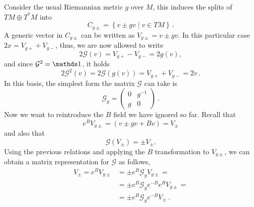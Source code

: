 \documentclass[debug]{phd}
\begin{document}
						Consider the usual Riemannian metric $g$ over $M$, this induces the splits of $TM \oplus T^*M$ into
								\begin{equation}
									C_{g\pm} = \left\{v \pm gv \mid v \in TM \right\}\, .
								\end{equation}
						A generic vector in $C_{g\pm}$ can be written as $V_{g\pm} = v \pm g v$. 
						In this particular case $2x= V_{g+} + V_{g-}$, thus, we are now allowed to write
								\begin{equation*}
									2\mathcal{G}(v) = V_{g+} - V_{g-} = 2 g(v),
								\end{equation*}
						and since $\mathcal{G}^2 = \id$, it holds
								\begin{equation*}
									2\mathcal{G}^2(v) = 2 \mathcal{G}(g(v)) = V_{g+} + V_{g-} = 2v \, .
								\end{equation*}
						In this basis, the simplest form the matrix $\mathcal{G}$ can take is
								\begin{equation*}
									\mathcal{G}_g = \begin{pmatrix} 0 & g^{-1} \\
 											g & 0 \end{pmatrix}\ .
								\end{equation*}
						Now we want to reintroduce the $B$ field we have ignored so far. 
						Recall that
								\begin{equation*}
									e^{B} V_{g\pm} = \left(v \pm gv + B v\right) = V_{\pm}
								\end{equation*}
						and also that 
								\begin{equation}\label{proj}
									\mathcal{G}\left(V_{\pm}\right) = \pm V_{\pm}.
								\end{equation}
						Using the previous relations and applying the $B$ transformation to $V_{g\pm}$, we can obtain a matrix representation for $\mathcal{G}$ as follows, 
								\begin{equation*}
									\begin{split}
										V_{\pm} = e^{B}V_{g\pm} & =\pm e^{B}\mathcal{G}_g V_{g\pm} = \\
														 & =\pm e^{B} \mathcal{G}_g e^{-B} e^{B} V_{g\pm} =\\
														 & = \pm e^{B} \mathcal{G}_g e^{-B} V_{\pm}\ .
									\end{split}
								\end{equation*}
\end{document}
